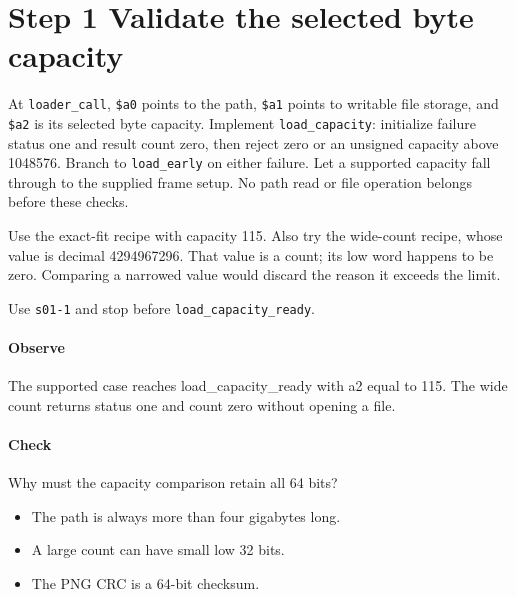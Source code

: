 \section{Step 1 Validate the selected byte capacity}\label{png-load-s01}
At \texttt{loader\_call}, \texttt{\$a0} points to the path, \texttt{\$a1} points to writable file storage, and \texttt{\$a2} is its selected byte capacity. Implement \texttt{load\_capacity}: initialize failure status one and result count zero, then reject zero or an unsigned capacity above 1048576. Branch to \texttt{load\_early} on either failure. Let a supported capacity fall through to the supplied frame setup. No path read or file operation belongs before these checks.

Use the exact-fit recipe with capacity 115. Also try the wide-count recipe, whose value is decimal 4294967296. That value is a count; its low word happens to be zero. Comparing a narrowed value would discard the reason it exceeds the limit.

Use \texttt{s01-1} and stop before \texttt{load\_capacity\_ready}.

\paragraph{Observe} The supported case reaches load\_capacity\_ready with a2 equal to 115. The wide count returns status one and count zero without opening a file.

\paragraph{Check} Why must the capacity comparison retain all 64 bits?
\begin{itemize}
  \item[A.] The path is always more than four gigabytes long.
  \item[B.] A large count can have small low 32 bits.
  \item[C.] The PNG CRC is a 64-bit checksum.
\end{itemize}
